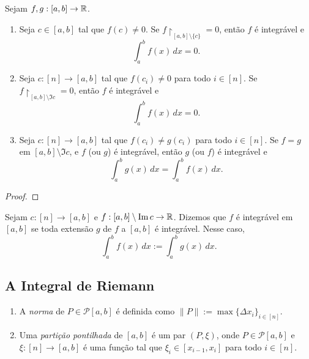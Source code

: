 \begin{proposition}
    Sejam $f,g : [a,b] \to \mathbb{R}$. 
        \begin{enumerate}[leftmargin=*, align=left, label=\textbf{(\alph*)}]
            \item Seja $c \in [a,b]$ tal que $f(c) \neq 0$. Se $f \restriction_{[a,b] \setminus \{c\}} = 0$, então $f$ é integrável e
                \[
                    \int_{a}^{b} f(x) \, dx = 0.
                \] 
            \item Seja $c : [n] \to [a,b]$ tal que $f(c_i) \neq 0$ para todo $i \in [n]$. Se $f \restriction_{[a,b] \setminus \Im c} = 0$, então $f$ é integrável e
                \[
                    \int_{a}^{b} f(x) \, dx = 0.
                \]
            \item Seja $c : [n] \to [a,b]$ tal que $f(c_i) \neq g(c_i)$ para todo $i \in [n]$. Se $f = g$ em $[a,b] \setminus \Im c$, e $f$ (ou $g$) é integrável, então $g$ (ou $f$) é integrável e
                \[
                    \int_{a}^{b} g(x) \, dx  = \int_{a}^{b} f(x) \, dx.
                \]
        \end{enumerate}
\end{proposition}

\begin{proof}
    \blackproof
\end{proof}

\begin{definition}
    Sejam $c : [n] \to [a,b]$ e $f:[a,b] \setminus \operatorname{Im} c \to \mathbb{R}$. Dizemos que $f$ é integrável em $[a,b]$ se toda extensão $g$ de $f$ a $[a,b]$ é integrável. Nesse caso,
        \[
            \int_{a}^{b} f(x) \, dx  := \int_{a}^{b} g(x) \, dx.
        \]
\end{definition}

\subsection{A Integral de Riemann}

\begin{definition}
    \leavevmode
        \begin{enumerate}[leftmargin=*, align=left, label=\textbf{(\alph*)}]
            \item A \emph{norma} de $P \in \mathcal{P}[a,b]$ é definida como $\|P\| := \max{\{ \Delta x_i \}_{i \in [n]}}$.
            \item Uma \emph{partição pontilhada} de $[a,b]$ é um par $(P, \xi)$, onde $P \in \mathcal{P}[a,b]$ e $\xi : [n] \to [a,b]$ é uma função tal que $\xi_i \in [x_{i-1}, x_i]$ para todo $i \in [n]$.
        \end{enumerate}
\end{definition}

